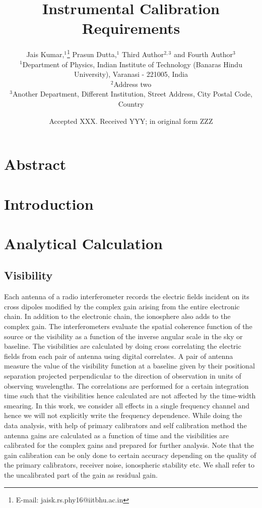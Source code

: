 \documentclass[fleqn,usenatbib]{mnras}
\title{Instrumental Calibration Requirements}
\author[Kumar et al.]{Jais Kumar,$^{1}$\thanks{E-mail: jaisk.rs.phy16@iitbhu.ac.in}
Prasun Dutta,$^{1}$
Third Author$^{2,3}$
and Fourth Author$^{3}$
\\
$^{1}$Department of Physics, Indian Institute of Technology (Banaras Hindu University), Varanasi - 221005, India\\
$^{2}$Address two\\
$^{3}$Another Department, Different Institution, Street Address, City Postal Code, Country
}
\date{Accepted XXX. Received YYY; in original form ZZZ}
\begin{document}
\label{firstpage}
\pagerange{\pageref{firstpage}--\pageref{lastpage}}
\maketitle

\section{Abstract}

\section{Introduction}

\section{Analytical Calculation}
\subsection{Visibility}
Each antenna of a radio interferometer records the electric fields incident on its cross dipoles modified by the complex gain arising from the entire electronic chain. In addition to the electronic chain, the ionosphere also adds to the complex gain. The interferometers evaluate the spatial coherence function of the source or the visibility as a function of the inverse angular scale in the sky or baseline.  The visibilities are calculated by doing cross correlating the electric fields from each pair of antenna using digital correlates. A pair of antenna measure the value of the visibility function at a baseline given by their positional separation projected perpendicular to the direction of observation in units of observing wavelengths. The correlations are performed for a certain integration time such that the visibilities hence calculated are not affected by the time-width smearing. In this work, we consider all effects in a single frequency channel and hence we will not explicitly write the frequency dependence. While doing the data analysis, with help of primary calibrators and self calibration method the antenna gains are calculated as a function of time and the visibilities are calibrated for the complex gains and prepared for further analysis. Note that the gain calibration can be only done to certain accuracy depending on the quality of the primary calibrators, receiver noise, ionospheric stability etc. We shall refer to the uncalibrated part of the gain as residual gain.
\end{document}
